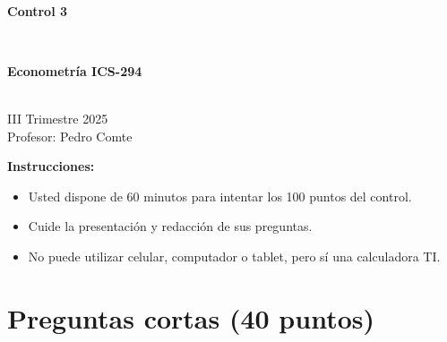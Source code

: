 \documentclass[10pt,a4paper]{article}
\begin{document}
\vspace{5cm}



\begin{center}
\begin{large}
\textbf{\\Control 3}
\end{large}\\
\end{center}

\begin{center}
\begin{large}
\textbf{Econometría ICS-294}
\end{large}\\
\vspace{0.2cm}
III Trimestre 2025\\
Profesor: Pedro Comte\\
\end{center}

\textbf{Instrucciones:} 

\begin{itemize}

    \item Usted dispone de 60 minutos  para intentar los 100 puntos del control.
    \item Cuide la presentación y redacción de sus preguntas.
    \item No puede utilizar celular, computador o tablet, pero sí una calculadora TI.
     
\end{itemize}

\section{Preguntas cortas (40 puntos)}
\end{document}
